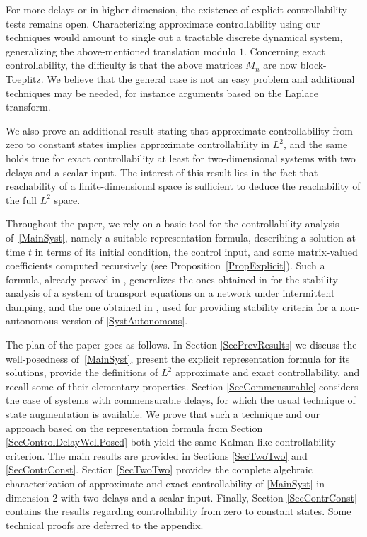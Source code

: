 \documentclass[JEP,XML,SOM,Unicode]{cedram}
\theoremstyle{plain}
\theoremstyle{definition}
\begin{document}
For more delays or in higher dimension, the existence of explicit controllability tests remains open. Characterizing approximate controllability using our techniques would amount to single out a tractable discrete dynamical system, generalizing the above-mentioned translation modulo $1$. Concerning exact controllability, the difficulty is that the above matrices $M_n$ are now block-Toeplitz. We believe that the general case is not an easy problem and additional techniques may be needed, for instance arguments based on the Laplace transform.

We also prove an additional result stating that approximate controllability from zero to constant states implies approximate controllability in $L^2$, and the same holds true for exact controllability at least for two-dimensional systems with two delays and a scalar input. The interest of this result lies in the fact that reachability of a finite-dimensional space is sufficient to deduce the reachability of the full $L^2$ space.

Throughout the paper, we rely on a basic tool for the controllability analysis of~\eqref{MainSyst}, namely a suitable representation formula, describing a solution at time $t$ in terms of its initial condition, the control input, and some matrix-valued coefficients computed recursively (see Proposition~\ref{PropExplicit}). Such a formula, already proved in \cite{Mazanti2017Relative}, generalizes the ones obtained in \cite[Th.\,3.3 \& 3.6]{Chitour2017Persistently} for the stability analysis of a system of transport equations on a network under intermittent damping, and the one obtained in \cite[Prop.\,3.14]{Chitour2016Stability}, used for providing stability criteria for a non-autonomous version of \eqref{SystAutonomous}.

The plan of the paper goes as follows. In Section \ref{SecPrevResults} we discuss the well-posedness of~\eqref{MainSyst}, present the explicit representation formula for its solutions, provide the definitions of $L^2$ approximate and exact controllability, and recall some of their elementary properties. Section \ref{SecCommensurable} considers the case of systems with commensurable delays, for which the usual technique of state augmentation is available. We prove that such a technique and our approach based on the representation formula from Section \ref{SecControlDelayWellPosed} both yield the same Kalman-like controllability criterion. The main results are provided in Sections \ref{SecTwoTwo} and \ref{SecContrConst}. Section \ref{SecTwoTwo} provides the complete algebraic characterization of approximate and exact controllability of \eqref{MainSyst} in dimension $2$ with two delays and a scalar input. Finally, Section \ref{SecContrConst} contains the results regarding controllability from zero to constant states. Some technical proofs are deferred to the appendix.
\end{document}
